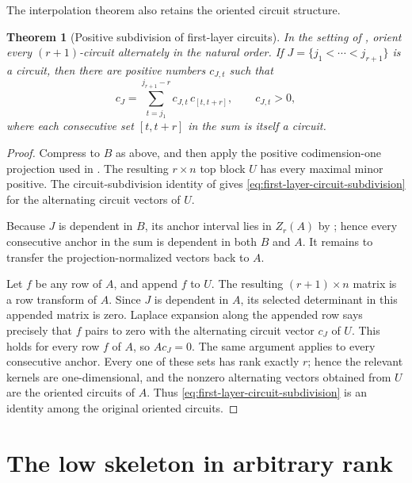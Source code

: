 \documentclass[11pt]{amsart}
\newtheorem{theorem}{Theorem}[section]
\theoremstyle{definition}
\theoremstyle{remark}
\begin{document}
The interpolation theorem also retains the oriented circuit structure.

\begin{theorem}[Positive subdivision of first-layer circuits]\label{thm:first-layer-circuits}
In the setting of , orient every $(r+1)$-circuit alternately in the natural order.  If $J=\{j_1<\cdots<j_{r+1}\}$ is a circuit, then there are positive numbers $c_{J,t}$ such that
\begin{equation}\label{eq:first-layer-circuit-subdivision}
 c_J=\sum_{t=j_1}^{j_{r+1}-r}c_{J,t}\,c_{[t,t+r]},
 \qquad c_{J,t}>0,
\end{equation}
where each consecutive set $[t,t+r]$ in the sum is itself a circuit.
\end{theorem}

\begin{proof}
Compress to $B$ as above, and then apply the positive codimension-one projection used in .  The resulting $r\times n$ top block $U$ has every maximal minor positive.  The circuit-subdivision identity of \cite[Corollary~5]{CGQpaving} gives \eqref{eq:first-layer-circuit-subdivision} for the alternating circuit vectors of $U$.

Because $J$ is dependent in $B$, its anchor interval lies in $Z_r(A)$ by ; hence every consecutive anchor in the sum is dependent in both $B$ and $A$.  It remains to transfer the projection-normalized vectors back to $A$.

Let $f$ be any row of $A$, and append $f$ to $U$.  The resulting $(r+1)\times n$ matrix is a row transform of $A$.  Since $J$ is dependent in $A$, its selected determinant in this appended matrix is zero.  Laplace expansion along the appended row says precisely that $f$ pairs to zero with the alternating circuit vector $c_J$ of $U$.  This holds for every row $f$ of $A$, so $Ac_J=0$.  The same argument applies to every consecutive anchor.  Every one of these sets has rank exactly $r$; hence the relevant kernels are one-dimensional, and the nonzero alternating vectors obtained from $U$ are the oriented circuits of $A$.  Thus \eqref{eq:first-layer-circuit-subdivision} is an identity among the original oriented circuits.
\end{proof}

\section{The low skeleton in arbitrary rank}\label{sec:low-skeleton}
\end{document}
